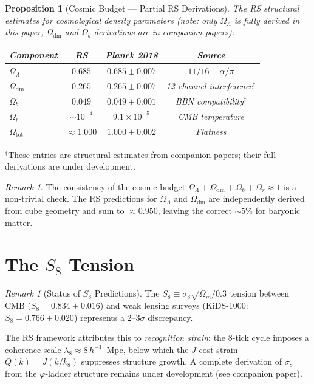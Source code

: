 \documentclass[12pt,a4paper]{article}
\newtheorem{proposition}[theorem]{Proposition}
\theoremstyle{definition}
\theoremstyle{remark}
\newtheorem{remark}[theorem]{Remark}
\begin{document}
\begin{proposition}[Cosmic Budget --- Partial RS Derivations]
\label{prop:budget}
The RS structural estimates for cosmological density parameters
(note: only $\Omega_\Lambda$ is fully derived in this paper;
$\Omega_{\mathrm{dm}}$ and $\Omega_b$ derivations are in
companion papers):
\begin{center}
\renewcommand{\arraystretch}{1.3}
\begin{tabular}{@{}lccc@{}}
\toprule
\textbf{Component} & \textbf{RS} &
\textbf{Planck 2018} & \textbf{Source} \\
\midrule
$\Omega_\Lambda$ & $0.685$ & $0.685 \pm 0.007$ &
$11/16 - \alpha/\pi$ \\
$\Omega_{\mathrm{dm}}$ & $0.265$ & $0.265 \pm 0.007$ &
12-channel interference$^\dagger$ \\
$\Omega_b$ & $0.049$ & $0.049 \pm 0.001$ &
BBN compatibility$^\dagger$ \\
$\Omega_r$ & $\sim 10^{-4}$ & $9.1 \times 10^{-5}$ &
CMB temperature \\
\midrule
$\Omega_{\mathrm{tot}}$ & $\approx 1.000$ & $1.000 \pm 0.002$
& Flatness \\
\bottomrule
\end{tabular}
\end{center}
\end{proposition}

\noindent $^\dagger$These entries are structural estimates from companion
papers; their full derivations are under development.

\begin{remark}
The consistency of the cosmic budget
$\Omega_\Lambda + \Omega_{\mathrm{dm}} + \Omega_b +
\Omega_r \approx 1$ is a non-trivial check.  The RS
predictions for $\Omega_\Lambda$ and $\Omega_{\mathrm{dm}}$
are independently derived from cube geometry and sum to
$\approx 0.950$, leaving the correct $\sim 5\%$ for
baryonic matter.
\end{remark}

\section{The $S_8$ Tension}
\label{sec:s8}

\begin{remark}[Status of $S_8$ Predictions]
The $S_8 \equiv \sigma_8 \sqrt{\Omega_m/0.3}$ tension
between CMB ($S_8 = 0.834 \pm 0.016$) and weak lensing
surveys (KiDS-1000: $S_8 = 0.766 \pm 0.020$) represents a
$2$--$3\sigma$ discrepancy.

The RS framework attributes this to \emph{recognition
strain}: the 8-tick cycle imposes a coherence scale
$\lambda_8 \approx 8\,h^{-1}$~Mpc, below which the
$J$-cost strain $Q(k) = J(k/k_8)$ suppresses structure
growth.  A complete derivation of $\sigma_8$ from the
$\varphi$-ladder structure remains under development
(see companion paper).
\end{remark}
\end{document}
